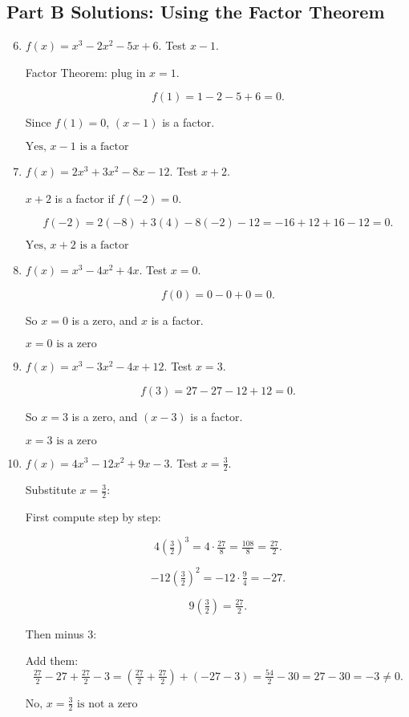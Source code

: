 \documentclass[12pt]{article}
\begin{document}
\subsection*{Part B Solutions: Using the Factor Theorem}
\begin{enumerate}
  \setcounter{enumi}{5}
  \item \(f(x) = x^3 - 2x^2 - 5x + 6\). Test \(x - 1\).

  Factor Theorem: plug in \(x = 1.\)

  \[
  f(1) = 1 - 2 - 5 + 6 = 0.
  \]

  Since \(f(1) = 0\), \((x - 1)\) is a factor.

  \(\boxed{\text{Yes, } x - 1 \text{ is a factor}}\)

  \item \(f(x) = 2x^3 + 3x^2 - 8x - 12\). Test \(x + 2\).

  \(x + 2\) is a factor if \(f(-2) = 0.\)

  \[
  f(-2) = 2(-8) + 3(4) - 8(-2) - 12 = -16 + 12 + 16 - 12 = 0.
  \]

  \(\boxed{\text{Yes, } x + 2 \text{ is a factor}}\)

  \item \(f(x) = x^3 - 4x^2 + 4x\). Test \(x = 0\).

  \[
  f(0) = 0 - 0 + 0 = 0.
  \]

  So \(x = 0\) is a zero, and \(x\) is a factor.

  \(\boxed{x = 0 \text{ is a zero}}\)

  \item \(f(x) = x^3 - 3x^2 - 4x + 12\). Test \(x = 3\).

  \[
  f(3) = 27 - 27 - 12 + 12 = 0.
  \]

  So \(x = 3\) is a zero, and \((x - 3)\) is a factor.

  \(\boxed{x = 3 \text{ is a zero}}\)

  \item \(f(x) = 4x^3 - 12x^2 + 9x - 3\). Test \(x = \tfrac{3}{2}\).

  Substitute \(x = \tfrac{3}{2}\):

  First compute step by step:

  \[
  4\left(\tfrac{3}{2}\right)^3
  = 4 \cdot \tfrac{27}{8}
  = \tfrac{108}{8}
  = \tfrac{27}{2}.
  \]

  \[
  -12\left(\tfrac{3}{2}\right)^2
  = -12 \cdot \tfrac{9}{4}
  = -27.
  \]

  \[
  9\left(\tfrac{3}{2}\right)
  = \tfrac{27}{2}.
  \]

  Then minus 3:

  Add them:
  \[
  \tfrac{27}{2} - 27 + \tfrac{27}{2} - 3
  = \left(\tfrac{27}{2} + \tfrac{27}{2}\right) + (-27 - 3)
  = \tfrac{54}{2} - 30
  = 27 - 30
  = -3 \ne 0.
  \]

  \(\boxed{\text{No, } x = \tfrac{3}{2} \text{ is not a zero}}\)
\end{enumerate}
\end{document}
